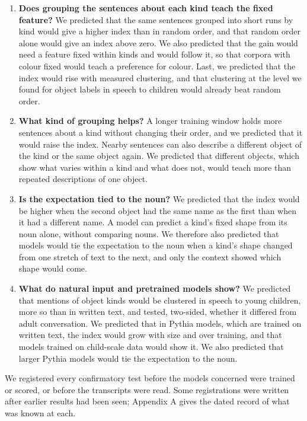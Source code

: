 \begin{enumerate}
\item \textbf{Does grouping the sentences about each kind teach the fixed feature?} We predicted that the same sentences grouped into short runs by kind would give a higher index than in random order, and that random order alone would give an index above zero. We also predicted that the gain would need a feature fixed within kinds and would follow it, so that corpora with colour fixed would teach a preference for colour. Last, we predicted that the index would rise with measured clustering, and that clustering at the level we found for object labels in speech to children would already beat random order.
\item \textbf{What kind of grouping helps?} A longer training window holds more sentences about a kind without changing their order, and we predicted that it would raise the index. Nearby sentences can also describe a different object of the kind or the same object again. We predicted that different objects, which show what varies within a kind and what does not, would teach more than repeated descriptions of one object.
\item \textbf{Is the expectation tied to the noun?} We predicted that the index would be higher when the second object had the same name as the first than when it had a different name. A model can predict a kind's fixed shape from its noun alone, without comparing nouns. We therefore also predicted that models would tie the expectation to the noun when a kind's shape changed from one stretch of text to the next, and only the context showed which shape would come.
\end{enumerate}

\begin{enumerate}\setcounter{enumi}{3}
\item \textbf{What do natural input and pretrained models show?} We predicted that mentions of object kinds would be clustered in speech to young children, more so than in written text, and tested, two-sided, whether it differed from adult conversation. We predicted that in Pythia models, which are trained on written text, the index would grow with size and over training, and that models trained on child-scale data would show it. We also predicted that larger Pythia models would tie the expectation to the noun.
\end{enumerate}

We registered every confirmatory test before the models concerned were trained or scored, or before the transcripts were read. Some registrations were written after earlier results had been seen; Appendix A gives the dated record of what was known at each.

